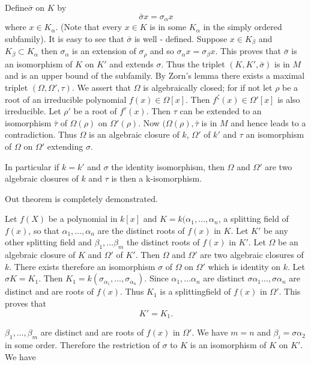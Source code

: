   Define\pageoriginale $ \bar{\sigma} $ on $K$ by 
  $$
  \bar{\sigma} x = \sigma_\alpha x
  $$
where  $ x \in K_\alpha $. (Note that every $x \in K$ is in some
$K_\alpha$ in the simply ordered subfamily). It is easy to see that
$\bar{\sigma}$ is well - defined. Suppose $ x \in K_\beta $ and
$K_\beta \subset K_\alpha$ then $\sigma_\alpha $ is an extension of
$\sigma_\rho$ and so $\sigma_\alpha x = \sigma_\beta x$. This
proves  that $\bar{\sigma}$ is an isomorphism of  $K$ on $ K'$ and
extends $\sigma$. Thus the triplet  $ ( K, K', \bar{\sigma}) $ is in
$M$ and is an upper bound of the  subfamily. By Zorn's lemma there
exists a maximal triplet $(\Omega, \Omega', \tau) $. We assert that $
\Omega $ is algebraically closed; for if  not let $\rho$ be a  root
of an irreducible polynomial $ f (x) \in  \Omega [ x ] $. Then
$f^\zeta (x) \in  \Omega' [x]$  is also irreducible. Let $ \rho' $ be
a root of $ f^\tau (x) $. Then $\tau$ can be extended to an
isomorphism $ \bar{\tau}$ of  $ \Omega ( \rho )$ on  $ \Omega'
(\rho)$. Now  $(\Omega (\rho), \bar{\tau} $  is in $M$ and hence
leads to a contradiction. Thus $\Omega$ is an algebraic closure of
$k$, $\Omega'$ of $k'$ and  $ \tau $ an isomorphism of $ \Omega$ on $
\Omega' $  extending $ \sigma $. 

In particular if $ k = k' $ and $ \sigma $  the  identity isomorphism,
then $ \Omega $ and $ \Omega' $ are  two algebraic closures of $k$ and
$ \tau $ is then a k-isomorphism. 

Out theorem is  completely demonstrated.

Let $ f(X) $ be a polynomial in $ k [ x ] $ and  $K = k ( \alpha_1,
\ldots , \alpha_n $, a splitting field  of $ f (x) $, so that
$\alpha_1, \ldots , \alpha_n $ are the distinct roots  of $f(x) $ in
$K$. Let $K'$  be any other splitting field and $ \beta_1, \ldots
\beta_m $  the distinct roots  of $ f (x) $ in $K'$. Let  $\Omega$  be
an algebraic  closure of $K$ and $\Omega' $ of $K'$. Then $ \Omega $
and  $ \Omega'$ are two algebraic  closures  of  $k$. There  exists
therefore an isomorphism $\sigma$ of $\Omega $ on $ \Omega' $  which
is identity on $k$. Let $\sigma K = K_1 $. Then $ K_1 = k (
\sigma_{\alpha_1}, \ldots, \sigma_{\alpha_{n}} )$. Since $\alpha_1
,\ldots \alpha_n$ are distinct $\sigma\alpha_1 \ldots, \sigma\alpha_n$
are distinct and are roots of $f(x)$. Thus $K_1$ is a
splitting\pageoriginale field of $ f (x) $ in $ \Omega' $. This proves
that   
$$
K' = K_1 .
$$

$ \beta_1, \ldots , \beta_m $ are distinct and are roots of  $ f (x) $
in $ \Omega'$. We have  $ m = n $ and $ \beta_i = \sigma \alpha_2 $
in some order. Therefore the restriction of  $ \sigma$ to $K$ is an
isomorphism of $K$ on $K'$. We have  

